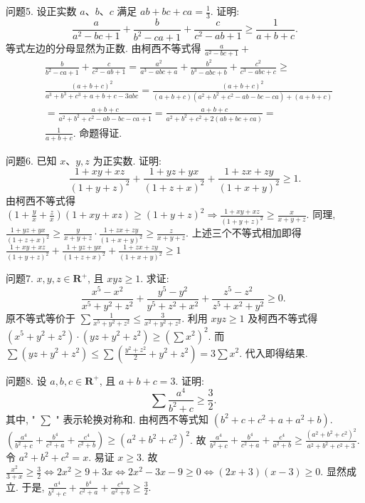 问题5. 设正实数 $a 、 b 、 c$ 满足 $a b+b c+c a=\frac{1}{3}$. 证明:
$$
\frac{a}{a^2-b c+1}+\frac{b}{b^2-c a+1}+\frac{c}{c^2-a b+1} \geqslant \frac{1}{a+b+c} .
$$
等式左边的分母显然为正数.
由柯西不等式得 $\frac{a}{a^2-b c+1}+$
$$
\begin{aligned}
& \frac{b}{b^2-c a+1}+\frac{c}{c^2-a b+1}=\frac{a^2}{a^3-a b c+a}+\frac{b^2}{b^3-a b c+b}+\frac{c^2}{c^3-a b c+c} \geqslant \\
& \frac{(a+b+c)^2}{a^3+b^3+c^3+a+b+c-3 a b c}=\frac{(a+b+c)^2}{(a+b+c)\left(a^2+b^2+c^2-a b-b c-c a\right)+(a+b+c)} \\
& =\frac{a+b+c}{a^2+b^2+c^2-a b-b c-c a+1}=\frac{a+b+c}{a^2+b^2+c^2+2(a b+b c+c a)}= \\
& \frac{1}{a+b+c} \text {. 命题得证.
}
\end{aligned}
$$



问题6. 已知 $x 、 y, z$ 为正实数.
证明:
$$
\frac{1+x y+x z}{(1+y+z)^2}+\frac{1+y z+y x}{(1+z+x)^2}+\frac{1+z x+z y}{(1+x+y)^2} \geqslant 1 .
$$
由柯西不等式得 $\left(1+\frac{y}{x}+\frac{z}{x}\right)(1+x y+x z) \geqslant(1+y+z)^2 \Rightarrow \frac{1+x y+x z}{(1+y+z)^2} \geqslant \frac{x}{x+y+z}$. 同理, $\frac{1+y z+y x}{(1+z+x)^2} \geqslant \frac{y}{x+y+z} \cdot \frac{1+z x+z y}{(1+x+y)^2} \geqslant \frac{z}{x+y+z}$. 上述三个不等式相加即得 $\frac{1+x y+x z}{(1+y+z)^2}+\frac{1+y z+y x}{(1+z+x)^2}+ \frac{1+z x+z y}{(1+x+y)^2} \geqslant 1$



问题7. $x, y, z \in \mathbf{R}^{+}$, 且 $x y z \geqslant 1$. 求证:
$$
\frac{x^5-x^2}{x^5+y^2+z^2}+\frac{y^5-y^2}{y^5+z^2+x^2}+\frac{z^5-z^2}{z^5+x^2+y^2} \geqslant 0 \text {. }
$$
原不等式等价于 $\sum \frac{1}{x^5+y^2+z^2} \leqslant \frac{3}{x^2+y^2+z^2}$. 利用 $x y z \geqslant 1$ 及柯西不等式得 $\left(x^5+y^2+z^2\right) \cdot\left(y z+y^2+z^2\right) \geqslant\left(\sum x^2\right)^2$. 而 $\sum\left(y z+y^2+z^2\right) \leqslant \sum\left(\frac{y^2+z^2}{2}+y^2+z^2\right)=3 \sum x^2$. 代入即得结果.



问题8. 设 $a, b, c \in \mathbf{R}^{+}$, 且 $a+b+c=3$. 证明:
$$
\sum \frac{a^4}{b^2+c} \geqslant \frac{3}{2} \text {. }
$$
其中, " $\sum$ " 表示轮换对称和.
由柯西不等式知 $\left(b^2+c+c^2+a+a^2+b\right)$.
$\left(\frac{a^4}{b^2+c}+\frac{b^4}{c^2+a}+\frac{c^4}{c^2+b}\right) \geqslant\left(a^2+b^2+c^2\right)^2$. 故 $\frac{a^4}{b^2+c}+\frac{b^4}{c^2+a}+\frac{c^4}{a^2+b} \geqslant \frac{\left(a^2+b^2+c^2\right)^2}{a^2+b^2+c^2+3}$. 令 $a^2+b^2+c^2=x$. 易证 $x \geqslant 3$. 故 $\frac{x^2}{3+x} \geqslant \frac{3}{2} \Leftrightarrow 2 x^2 \geqslant 9+3 x \Leftrightarrow 2 x^2-3 x-9 \geqslant 0 \Leftrightarrow(2 x+3)(x-3) \geqslant 0$. 显然成立.
于是, $\frac{a^4}{b^2+c}+ \frac{b^4}{c^2+a}+\frac{c^4}{a^2+b} \geqslant \frac{3}{2}$.



